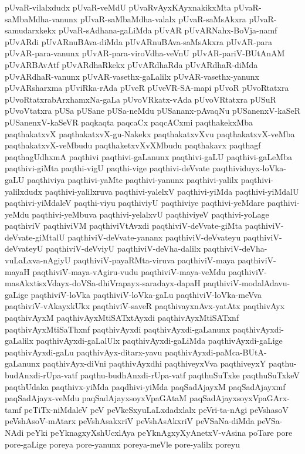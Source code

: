 {pUvaR-vilalxdudx
pUvaR-veMdU
pUvaRvAyxKAyxnakikxMta
pUvaR-saMbaMdha-vanunx
pUvaR-saMbaMdha-valalx
pUvaR-saMsAkxra
pUvaR-samudarxkekx
pUvaR-sAdhana-gaLiMda
pUvAR
pUvARNahx-BoVja-namf
pUvARdi
pUvARnuBAva-diMda
pUvARnuBAva-saMsAkxra
pUvAR-para
pUvAR-para-vanunx
pUvAR-para-viroVdha-veVnU
pUvAR-pariV-BUtAnAM
pUvARBAvAtf
pUvARdhaRkekx
pUvARdhaRda
pUvARdhaR-diMda
pUvARdhaR-vanunx
pUvAR-vasethx-gaLalilx
pUvAR-vasethx-yanunx
pUvARsharxma
pUviRka-rAda
pUveR
pUveVR-SA-mapi
pUvoR
pUvoRtatxra
pUvoRtatxrabArxhamxNa-gaLa
pUvoVRkatx-vAda
pUvoVRtatxra
pUSuR
pUvoVtatxra
pUSa
pUSane
pUSa-neMdu
pUSananx-pAvaqNu
pUSanenxV-kaSeR
pUSanenxV-kaSeVR
paqkaqta
paqcaCx
paqcACxmi
paqthakekxMba
paqthakatxvX
paqthakatxvX-gu-Nakekx
paqthakatxvXvu
paqthakatxvX-veMba
paqthakatxvX-veMbudu
paqthaketxvXvXMbudu
paqthakavx
paqthagf
paqthagUdhxmA
paqthivi
paqthivi-gaLanunx
paqthivi-gaLU
paqthivi-gaLeMba
paqthivi-giMta
paqthi-vigU
paqthi-vige
paqthivi-deVvate
paqthividuyx-loVka-gaLU
paqthiviya
paqthivi-yaMte
paqthivi-yanunx
paqthivi-yalilx
paqthivi-yalilxdudx
paqthivi-yalilxruva
paqthivi-yalelxV
paqthivi-yiMda
paqthivi-yiMdalU
paqthivi-yiMdaleV
paqthi-viyu
paqthiviyU
paqthiviye
paqthivi-yeMdare
paqthivi-yeMdu
paqthivi-yeMbuva
paqthivi-yelalxvU
paqthiviyeV
paqthivi-yoLage
paqthiviV
paqthiviVM
paqthiviVtAvxdi
paqthiviV-deVvate-giMta
paqthiviV-deVvate-giMtalU
paqthiviV-deVvate-yananx
paqthiviV-deVvateyu
paqthiviV-deVvateyU
paqthiviV-deVviyU
paqthiviV-deVha-dalilx
paqthiviV-deVha-vuLaLxva-nAgiyU
paqthiviV-payaRMta-viruva
paqthiviV-maya
paqthiviV-mayaH
paqthiviV-maya-vAgiru-vudu
paqthiviV-maya-veMdu
paqthiviV-masAkxtisxVdayx-doVSa-dhiVrapayx-saradayx-dapaH
paqthiviV-modalAdavu-gaLige
paqthiviV-loVka
paqthiviV-loVka-gaLu
paqthiviV-loVka-meVva
paqthiviV-vAkayxkUkx
paqthiviV-saveR
paqthivayxnAvx-yatAtx
paqthivAyx
paqthivAyxM
paqthivAyxMtiSATxtAyxdi
paqthivAyxMtiSATxnf
paqthivAyxMtiSaThxnf
paqthivAyxdi
paqthivAyxdi-gaLanunx
paqthivAyxdi-gaLalilx
paqthivAyxdi-gaLalUlx
paqthivAyxdi-gaLiMda
paqthivAyxdi-gaLige
paqthivAyxdi-gaLu
paqthivAyx-ditarx-yavu
paqthivAyxdi-paMca-BUtA-gaLanunx
paqthivAyx-diVni
paqthivAyxdhi
paqthiveyxVva
paqthiveyxY
paqthu-budAnxdi-rUpa-vatf
paqthu-budhAnxdi-rUpa-vatf
paqthuSuTxke
paqthuSuTxkeV
paqthUdaka
paqthivx-yiMda
paqdhivi-yiMda
paqSadAjayxM
paqSadAjayxmf
paqSadAjayx-veMdu
paqSadAjayxsoyxVpaGAtaM
paqSadAjayxsoyxVpaGArx-tamf
peTiTx-niMdaleV
peV
peVkeSxyuLaLxdadxlalx
peVri-ta-nAgi
peVshasoV
peVshAsoV-mAtarx
peVshAsakxriV
peVshAsAkxriV
peVSaNa-diMda
peVSa-NAdi
peYki
peYknagxyXshUcxlAya
peYknAgxyXyAnetxV-vAsina
poTare
pore
pore-gaLige
poreya
pore-yanunx
poreya-meVle
pore-yalilx
poreyu
}
